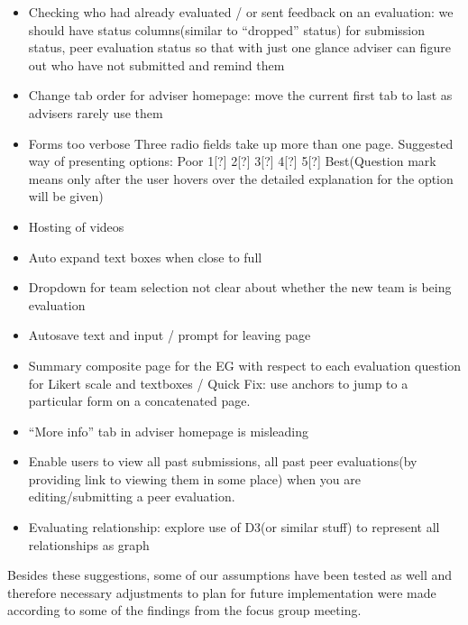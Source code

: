 \begin{itemize}
  \item Checking who had already evaluated / or sent feedback on an evaluation: we should have status columns(similar to ``dropped'' status) for submission status, peer evaluation status so that with just one glance adviser can figure out who have not submitted and remind them
  \item Change tab order for adviser homepage: move the current first tab to last as advisers rarely use them
  \item Forms too verbose Three radio fields take up more than one page. Suggested way of presenting options: Poor 1[?] 2[?] 3[?] 4[?] 5[?] Best(Question mark means only after the user hovers over the detailed explanation for the option will be given)
  \item Hosting of videos
  \item Auto expand text boxes when close to full
  \item Dropdown for team selection not clear about whether the new team is being evaluation
  \item Autosave text and input / prompt for leaving page
  \item Summary composite page for the EG with respect to each evaluation question for Likert scale and textboxes / Quick Fix: use anchors to jump to a particular form on a concatenated page.
  \item ``More info'' tab in adviser homepage is misleading
  \item Enable users to view all past submissions, all past peer evaluations(by providing link to viewing them in some place) when you are editing/submitting a peer evaluation.
  \item Evaluating relationship: explore use of D3(or similar stuff) to represent all relationships as graph
\end{itemize}

Besides these suggestions, some of our assumptions have been tested as well and therefore necessary adjustments to plan for future implementation were made according to some of the findings from the focus group meeting.
